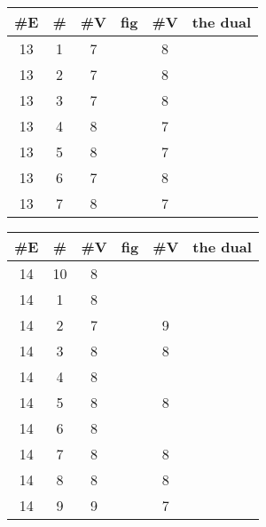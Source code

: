 \documentclass{amsart}
\begin{document}
\begin{table}[ht]
\begin{tabular}{|c|c|c|c || c|c|}
 \#E & \# & \#V & fig &\#V & the dual\\
 \hline
13 & 1 & 7 &   &%
         8 &  \\%
13 & 2 & 7 &   &%
         8 &  \\%
13 & 3 & 7 &   &%
         8 &  \\%
13 & 4 & 8 &   &%
         7 &  \\%
13 & 5 & 8 &   &%
         7 &  \\%
13 & 6 & 7 &  &%
         8 &  \\%
13 & 7 & 8 & &%
         7 &   \\%
\end{tabular}
\end{table}
\begin{table}[ht]
\begin{tabular}{|c|c|c|c || c|c|}
      \#E & \# & \#V & fig &  \#V &the dual\\
\hline
14 & 10 & 8  &   \\%
14 & 1 & 8   && \\%
14 & 2 & 7   & &%
         9   &   \\%
14 & 3 & 8   &  &%
         8   &   \\%
14 & 4 & 8   &   \\%
14 & 5 & 8   &  &%
         8   &   \\%
14 & 6 & 8   &   \\%
14 & 7 & 8   &  &%
         8   &   \\%
14 & 8 & 8   &  &%
         8   &   \\%
14 & 9 & 9   &  &%
         7   &   \\%
\end{tabular}
\end{table}
\end{document}
